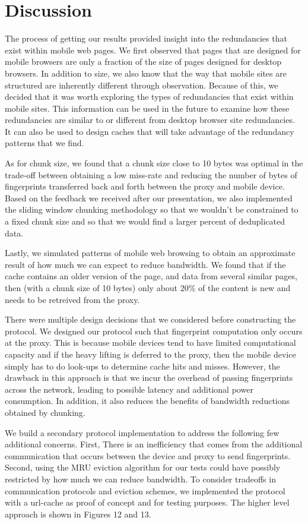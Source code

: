 \section{Discussion}
\label{sec:discussion}
The process of getting our results provided insight into the redundancies that exist within mobile web pages. We first observed that pages that are designed for mobile browsers are only a fraction of the size of pages designed for desktop browsers. In addition to size, we also know that the way that mobile sites are structured are inherently different through observation. Because of this, we decided that it was worth exploring the types of redundancies that exist within mobile sites. This information can be used in the future to examine how these redundancies are similar to or different from desktop browser site redundancies. It can also be used to design caches that will take advantage of the redundancy patterns that we find. 

As for chunk size, we found that a chunk size close to 10 bytes was optimal in the trade-off between obtaining a low miss-rate and reducing the number of bytes of fingerprints transferred back and forth between the proxy and mobile device. Based on the feedback we received after our presentation, we also implemented the sliding window chunking methodology so that we wouldn't be constrained to a fixed chunk size and so that we would find a larger percent of deduplicated data. 

Lastly, we simulated patterns of mobile web browsing to obtain an approximate result of how much we can expect to reduce bandwidth. We found that if the cache contains an older version of the page, and data from several similar pages, then (with a chunk size of 10 bytes) only about 20\% of the content is new and needs to be retreived from the proxy. 

There were multiple design decisions that we considered before constructing the protocol. We designed our protocol such that fingerprint computation only occurs at the proxy. This is because mobile devices tend to have limited computational capacity and if the heavy lifting is deferred to the proxy, then the mobile device simply has to do look-ups to determine cache hits and misses. However, the drawback in this approach is that we incur the overhead of passing fingerprints across the network, leading to possible latency and additional power consumption. In addition, it also reduces the benefits of bandwidth reductions obtained by chunking.

We build a secondary protocol implementation to address the following few additional concerns. First, There is an inefficiency that comes from the additional communication that occurs between the device and proxy to send fingerprints. Second, using the MRU eviction algorithm for our tests could have possibly restricted by how much we can reduce bandwidth. To consider tradeoffs in communication protocols and eviction schemes, we implemented the protocol with a url-cache as proof of concept and for testing purposes. The higher level approach is shown in Figures 12 and 13. 

